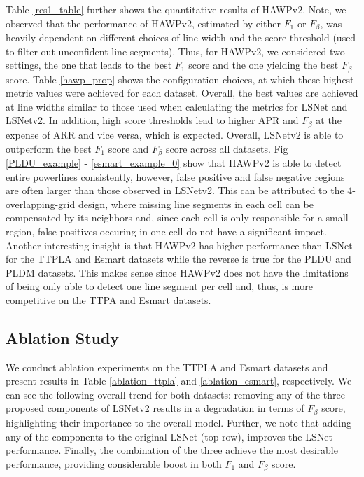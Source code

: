 \documentclass[journal]{IEEEtran}
\begin{document}
Table \ref{res1_table} further shows the quantitative results of HAWPv2. Note, we observed that the performance of HAWPv2, estimated by either $F_1$ or $F_\beta$, was heavily dependent on different choices of line width and the score threshold (used to filter out unconfident line segments). Thus, for HAWPv2, we considered two settings, the one that leads to the best $F_1$ score and the one yielding the best $F_\beta$ score. Table \ref{hawp_prop} shows the configuration choices, at which these highest metric values were achieved for each dataset. Overall, the best values are achieved at line widths similar to those used when calculating the metrics for LSNet and LSNetv2. In addition, high score thresholds lead to higher APR and $F_\beta$ at the expense of ARR and vice versa, which is expected. Overall, LSNetv2 is able to outperform the best $F_1$ score and $F_\beta$ score across all datasets. Fig \ref{PLDU_example} - \ref{esmart_example_0} show that HAWPv2 is able to detect entire powerlines consistently, however, false positive and false negative regions are often larger than those observed in LSNetv2. This can be attributed to the 4-overlapping-grid design, where missing line segments in each cell can be compensated by its neighbors and, since each cell is only responsible for a small region, false positives occuring in one cell do not have a significant impact. Another interesting insight is that HAWPv2 has higher performance than LSNet for the TTPLA and Esmart datasets while the reverse is true for the PLDU and PLDM datasets. This makes sense since HAWPv2 does not have the limitations of being only able to detect one line segment per cell and, thus, is more competitive on the TTPA and Esmart datasets.


\subsection{Ablation Study}
We conduct ablation experiments on the TTPLA and Esmart datasets and present results in Table \ref{ablation_ttpla} and \ref{ablation_esmart}, respectively. We can see the following overall trend for both datasets: removing any of the three proposed components of LSNetv2 results in a degradation in terms of $F_{\beta}$ score, highlighting their importance to the overall model. Further, we note that adding any of the components to the original LSNet (top row), improves the LSNet performance.
Finally, the combination of the three achieve the most desirable performance, providing considerable boost in both  $F_1$ and $F_{\beta}$ score.
\end{document}
